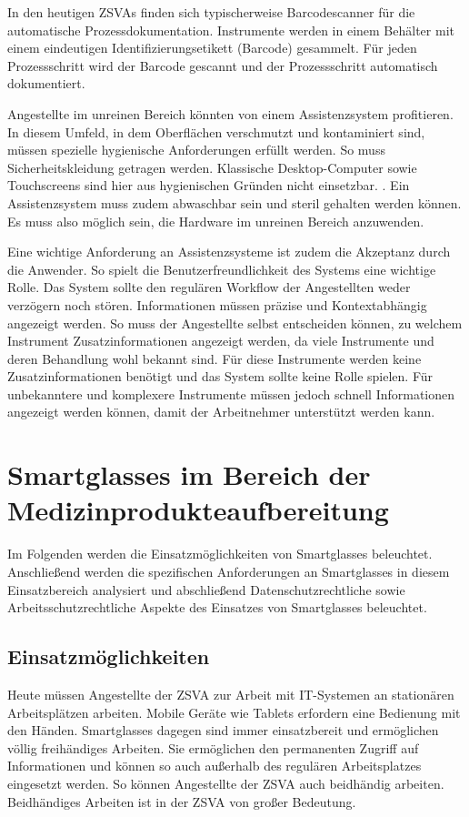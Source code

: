 In den heutigen ZSVAs finden sich typischerweise Barcodescanner für die automatische Prozessdokumentation. Instrumente werden in einem Behälter mit einem eindeutigen Identifizierungsetikett (Barcode) gesammelt. Für jeden Prozessschritt wird der Barcode gescannt und der Prozessschritt automatisch dokumentiert.

Angestellte im unreinen Bereich könnten von einem Assistenzsystem profitieren. 
In diesem Umfeld, in dem Oberflächen verschmutzt und kontaminiert sind, müssen spezielle hygienische Anforderungen erfüllt werden. So muss Sicherheitskleidung getragen werden. Klassische Desktop-Computer sowie Touchscreens sind hier aus hygienischen Gründen nicht einsetzbar.  \cite[S.~28]{Ruther2014}. Ein Assistenzsystem muss zudem abwaschbar sein und steril gehalten werden können. Es muss also möglich sein, die Hardware im unreinen Bereich anzuwenden. 

Eine wichtige Anforderung an Assistenzsysteme ist zudem die Akzeptanz durch die Anwender. So spielt die Benutzerfreundlichkeit des Systems eine wichtige Rolle. Das System sollte den regulären Workflow der Angestellten weder verzögern noch stören. Informationen müssen präzise und Kontextabhängig angezeigt werden. So muss der Angestellte selbst entscheiden können, zu welchem Instrument Zusatzinformationen angezeigt werden, da viele Instrumente und deren Behandlung wohl bekannt sind. Für diese Instrumente werden keine Zusatzinformationen benötigt und das System sollte keine Rolle spielen. Für unbekanntere und komplexere Instrumente müssen jedoch schnell Informationen angezeigt werden können, damit der Arbeitnehmer unterstützt werden kann. \cite[S.~29]{Ruther2014} 
%
%
\section{Smartglasses im Bereich der Medizinprodukteaufbereitung}
Im Folgenden werden die Einsatzmöglichkeiten von Smartglasses beleuchtet. Anschließend werden die spezifischen Anforderungen an Smartglasses in diesem Einsatzbereich analysiert und abschließend Datenschutzrechtliche sowie Arbeitsschutzrechtliche Aspekte des Einsatzes von Smartglasses beleuchtet.
%
%
\subsection{Einsatzmöglichkeiten}
Heute müssen Angestellte der ZSVA zur Arbeit mit IT-Systemen an stationären Arbeitsplätzen arbeiten. Mobile Geräte wie Tablets erfordern eine Bedienung mit den Händen. Smartglasses dagegen sind immer einsatzbereit und ermöglichen völlig freihändiges Arbeiten. Sie ermöglichen den permanenten Zugriff auf Informationen und können so auch außerhalb des regulären Arbeitsplatzes eingesetzt werden. So können Angestellte der ZSVA auch beidhändig arbeiten. Beidhändiges Arbeiten ist in der ZSVA von großer Bedeutung.

